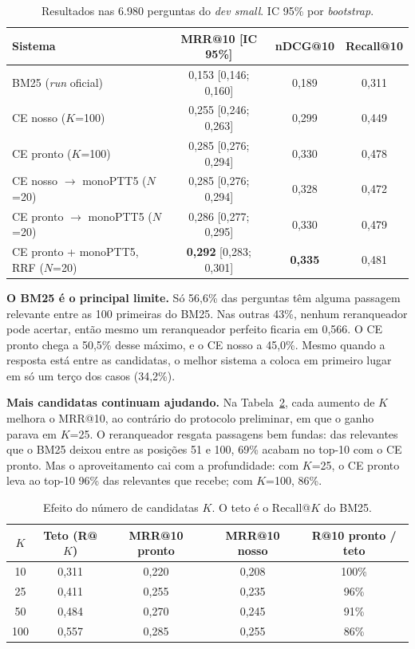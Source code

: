 \documentclass[12pt]{article}
\begin{document}
\begin{table}[ht]
\centering
\caption{Resultados nas 6.980 perguntas do \textit{dev small}. IC 95\% por \textit{bootstrap}.}
\label{tab:principal}
\small
\begin{tabular}{lccc}
\toprule
Sistema & MRR@10 [IC 95\%] & nDCG@10 & Recall@10 \\
\midrule
BM25 (\textit{run} oficial) & 0,153 [0,146; 0,160] & 0,189 & 0,311 \\
CE nosso ($K$=100) & 0,255 [0,246; 0,263] & 0,299 & 0,449 \\
CE pronto ($K$=100) & 0,285 [0,276; 0,294] & 0,330 & 0,478 \\
CE nosso $\rightarrow$ monoPTT5 ($N$=20) & 0,285 [0,276; 0,294] & 0,328 & 0,472 \\
CE pronto $\rightarrow$ monoPTT5 ($N$=20) & 0,286 [0,277; 0,295] & 0,330 & 0,479 \\
CE pronto + monoPTT5, RRF ($N$=20) & \textbf{0,292} [0,283; 0,301] & \textbf{0,335} & 0,481 \\
\bottomrule
\end{tabular}
\end{table}

\textbf{O BM25 é o principal limite.} Só 56,6\% das perguntas têm alguma passagem relevante
entre as 100 primeiras do BM25. Nas outras 43\%, nenhum reranqueador pode acertar, então
mesmo um reranqueador perfeito ficaria em 0,566. O CE pronto chega a 50,5\% desse máximo, e o
CE nosso a 45,0\%. Mesmo quando a resposta está entre as candidatas, o melhor sistema a coloca
em primeiro lugar em só um terço dos casos (34,2\%).

\textbf{Mais candidatas continuam ajudando.} Na Tabela~\ref{tab:k}, cada aumento de $K$ melhora
o MRR@10, ao contrário do protocolo preliminar, em que o ganho parava em $K$=25. O
reranqueador resgata passagens bem fundas: das relevantes que o BM25 deixou entre as posições
51 e 100, 69\% acabam no top-10 com o CE pronto. Mas o aproveitamento cai com a profundidade:
com $K$=25, o CE pronto leva ao top-10 96\% das relevantes que recebe; com $K$=100, 86\%.

\begin{table}[ht]
\centering
\caption{Efeito do número de candidatas $K$. O teto é o Recall@$K$ do BM25.}
\label{tab:k}
\begin{tabular}{ccccc}
\toprule
$K$ & Teto (R@$K$) & MRR@10 pronto & MRR@10 nosso & R@10 pronto / teto \\
\midrule
10 & 0,311 & 0,220 & 0,208 & 100\% \\
25 & 0,411 & 0,255 & 0,235 & 96\% \\
50 & 0,484 & 0,270 & 0,245 & 91\% \\
100 & 0,557 & 0,285 & 0,255 & 86\% \\
\bottomrule
\end{tabular}
\end{table}
\end{document}
